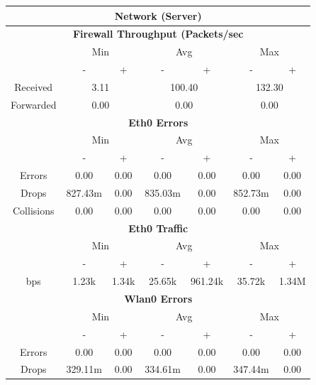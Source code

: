 \documentclass[11pt,a4paper]{scrreprt}
\begin{document}
\begin{table}[H]
\centering
    \begin{tabular}{||c|c|c|c|c|c|c||}
    \hline
    \multicolumn{7}{|c|}{\textbf{Network (Server)}} \\
    \hline
    \multicolumn{7}{|c|}{\textbf{Firewall Throughput (Packets/sec}} \\
    \hline\hline
      & \multicolumn{2}{|c|}{Min} & \multicolumn{2}{|c|}{Avg} & \multicolumn{2}{|c|}{Max} \\
    \hline
      & - & + & - & + & - & + \\
    \hline
    Received & \multicolumn{2}{|c|}{3.11} & \multicolumn{2}{|c|}{100.40} & \multicolumn{2}{|c|}{132.30} \\
    \hline
    Forwarded & \multicolumn{2}{|c|}{0.00} & \multicolumn{2}{|c|}{0.00} & \multicolumn{2}{|c|}{0.00} \\
    \hline\hline
    \multicolumn{7}{|c|}{\textbf{Eth0 Errors}} \\
    \hline\hline
      & \multicolumn{2}{|c|}{Min} & \multicolumn{2}{|c|}{Avg} & \multicolumn{2}{|c|}{Max} \\
    \hline
     & - & + & - & + & - & + \\
    \hline
    Errors & 0.00 & 0.00 & 0.00 & 0.00 & 0.00 & 0.00 \\
    \hline
    Drops & 827.43m & 0.00 & 835.03m & 0.00 & 852.73m & 0.00 \\
    \hline
    Collisions & 0.00 & 0.00 & 0.00 & 0.00 & 0.00 & 0.00 \\
    \hline\hline
    \multicolumn{7}{|c|}{\textbf{Eth0 Traffic}} \\
    \hline\hline
      & \multicolumn{2}{|c|}{Min} & \multicolumn{2}{|c|}{Avg} & \multicolumn{2}{|c|}{Max} \\
    \hline
      & - & + & - & + & - & + \\
    \hline
    bps & 1.23k & 1.34k & 25.65k & 961.24k & 35.72k & 1.34M \\
    \hline\hline
    \multicolumn{7}{|c|}{\textbf{Wlan0 Errors}} \\
    \hline\hline
      & \multicolumn{2}{|c|}{Min} & \multicolumn{2}{|c|}{Avg} & \multicolumn{2}{|c|}{Max} \\
    \hline
      & - & + & - & + & - & + \\
    \hline
    Errors  & 0.00 & 0.00 & 0.00 & 0.00 & 0.00 & 0.00 \\
    \hline
    Drops & 329.11m & 0.00 & 334.61m & 0.00 & 347.44m & 0.00 \\

\end{tabular}
\end{table}
\end{document}
